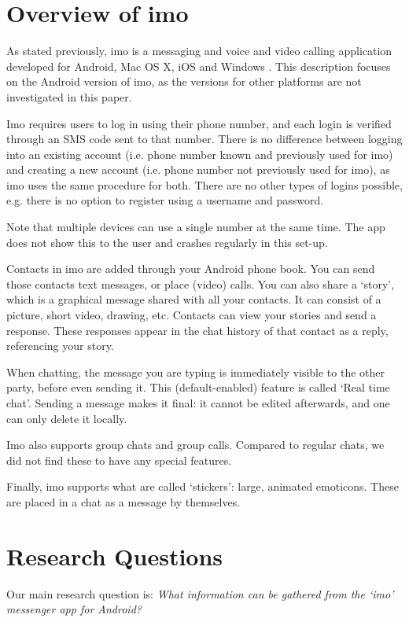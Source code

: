 \documentclass[conference]{IEEEtran}
\begin{document}
\section{Overview of imo}

As stated previously, imo is a messaging and voice and video calling
application developed for Android, Mac OS X, iOS and Windows \cite{imo}. This
description focuses on the Android version of imo, as the versions for other
platforms are not investigated in this paper.

Imo requires users to log in using their phone number, and each login is
verified through an SMS code sent to that number. There is no difference
between logging into an existing account (i.e. phone number known and
previously used for imo) and creating a new account (i.e. phone number not
previously used for imo), as imo uses the same procedure for both. There are no
other types of logins possible, e.g. there is no option to register using a
username and password.

Note that multiple devices can use a single number at the same time. The app
does not show this to the user and crashes regularly in this set-up.

Contacts in imo are added through your Android phone book. You can send those
contacts text messages, or place (video) calls. You can also share a `story',
which is a graphical message shared with all your contacts. It can consist of a
picture, short video, drawing, etc. Contacts can view your stories and send a
response. These responses appear in the chat history of that contact as a
reply, referencing your story.

When chatting, the message you are typing is immediately visible to the other
party, before even sending it. This (default-enabled) feature is called `Real
time chat'. Sending a message makes it final: it cannot be edited afterwards,
and one can only delete it locally.

Imo also supports group chats and group calls. Compared to regular chats, we
did not find these to have any special features.

Finally, imo supports what are called `stickers': large, animated emoticons.
These are placed in a chat as a message by themselves.


\section{Research Questions}\label{sec:researchq}

Our main research question is:
{\it What information can be gathered from the `imo' messenger app for Android?}
\end{document}
